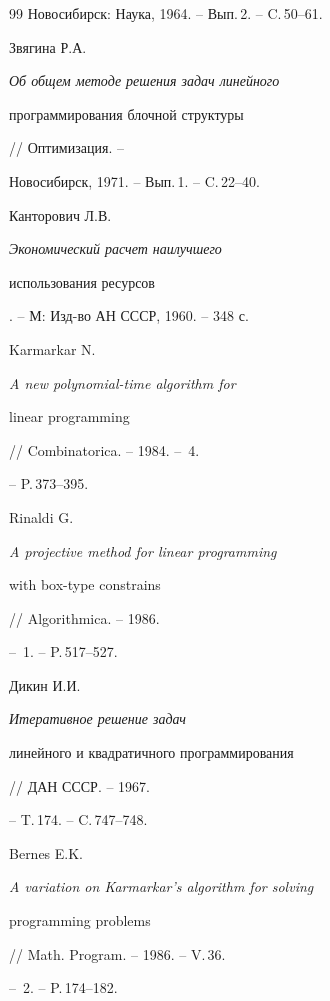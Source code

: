 \begin{thebibliography}{99}
Новосибирск: Наука, 1964. -- Вып.\,2. -- C.\,50--61.







Звягина Р.А. {\em Об общем методе решения задач линейного


программирования блочной структуры} // Оптимизация. -- 


Новосибирск, 1971. -- Вып.\,1. -- C.\,22--40.







Канторович Л.В. {\em Экономический расчет наилучшего


использования ресурсов}. -- М: Изд-во АН СССР, 1960. -- 348 с.







Karmarkar N. {\em A new polynomial-time algorithm for


linear programming} // Combinatorica. -- 1984. -- \No\,4.


-- P.\,373--395.







Rinaldi G. {\em A projective method for linear programming


with box-type constrains} // Algorithmica. -- 1986. 


-- \No\,1. -- P.\,517--527.







Дикин И.И. {\em Итеративное решение задач


линейного и квадратичного программирования} // ДАН СССР. -- 1967.


-- T.\,174. -- C.\,747--748.







Bernes E.K. {\em A variation on Karmarkar's algorithm for solving


programming problems} // Math. Program. -- 1986. -- V.\,36.


-- \No\,2. -- P.\,174--182.








\end{thebibliography}
